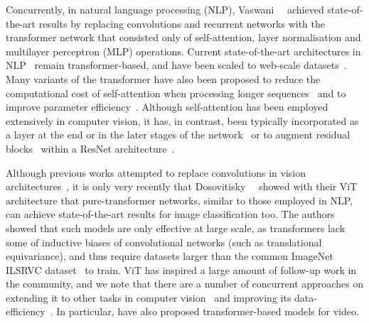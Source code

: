 \documentclass[10pt,twocolumn,letterpaper]{article}
\begin{document}
Concurrently, in natural language processing (NLP), Vaswani~\etal~\cite{vaswani_neurips_2017} achieved state-of-the-art results by replacing convolutions and recurrent networks with the transformer network that consisted only of self-attention, layer normalisation and multilayer perceptron (MLP) operations.
Current state-of-the-art architectures in NLP~\cite{devlin_naacl_2019, raffel_jmlr_2020} remain transformer-based, and have been scaled to web-scale datasets~\cite{brown_gpt3_neurips_2020}.
Many variants of the transformer have also been proposed to reduce the computational cost of self-attention when processing longer sequences~\cite{child_arxiv_2019, choromanski_arxiv_2020,kitaev_iclr_2020, tay2020long, tay2020efficient, wang_arxiv_2020} and to improve parameter efficiency~\cite{lan2019albert, dehghani2018universal}.
Although self-attention has been employed extensively in computer vision, it has, in contrast, been typically incorporated as a layer at the end or in the later stages of the network~\cite{wang_cvpr_2018, carion_eccv_2020,  huang_ccnet_iccv_2019,wang_vistr_arxiv_2020, zhang_dgmn_cvpr_2020} or to augment residual blocks~\cite{hu_squeeze_excite_cvpr_2018, cao_gcnet_cvprw_2019, chen_danet_neurips_2018, srinivas_cvpr_2021} within a ResNet architecture~\cite{he_cvpr_2016}.

Although previous works attempted to replace convolutions in vision architectures~\cite{parmar_icml_2018, ramachandran_neurips_2019, shen_gsa_iclr_2021}, it is only very recently that Dosovitisky~\etal~\cite{dosovitskiy_iclr_2021} showed with their ViT architecture that pure-transformer networks, similar to those employed in NLP, can achieve state-of-the-art results for image classification too.
The authors showed that such models are only effective at large scale, as transformers lack some of inductive biases of convolutional networks (such as translational equivariance), and thus require datasets larger than the common ImageNet ILSRVC dataset~\cite{deng_cvpr_2009} to train.
ViT has inspired a large amount of follow-up work in the community, and we note that there are a number of concurrent approaches on extending it to other tasks in computer vision~\cite{wang_maxdeeplab_arxiv_2020,wang_pvt_arxiv_2021, zhao_point_transformer_arxiv_2020,zheng_setr_arxiv_2020} and improving its data-efficiency~\cite{touvron_arxiv_2020,pan_hvt_arxiv_2021}.
In particular, \cite{bertasius_arxiv_2021,neimark_arxiv_2021} have also proposed transformer-based models for video.
\end{document}
